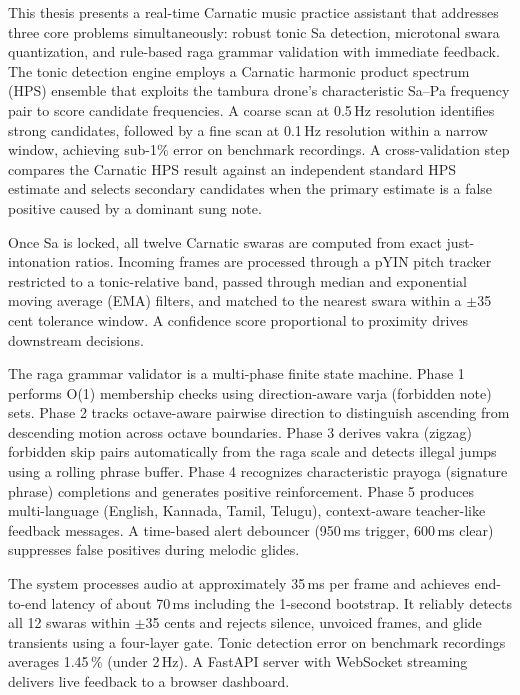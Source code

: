 \documentclass[12pt,a4paper]{report}
\numberwithin{equation}{chapter}
\begin{document}
This thesis presents a real-time Carnatic music practice assistant that addresses three core problems simultaneously: robust tonic Sa detection, microtonal swara quantization, and rule-based raga grammar validation with immediate feedback. The tonic detection engine employs a Carnatic harmonic product spectrum (HPS) ensemble that exploits the tambura drone's characteristic Sa--Pa frequency pair to score candidate frequencies. A coarse scan at 0.5\,Hz resolution identifies strong candidates, followed by a fine scan at 0.1\,Hz resolution within a narrow window, achieving sub-1\% error on benchmark recordings. A cross-validation step compares the Carnatic HPS result against an independent standard HPS estimate and selects secondary candidates when the primary estimate is a false positive caused by a dominant sung note.

Once Sa is locked, all twelve Carnatic swaras are computed from exact just-intonation ratios. Incoming frames are processed through a pYIN pitch tracker restricted to a tonic-relative band, passed through median and exponential moving average (EMA) filters, and matched to the nearest swara within a $\pm$35 cent tolerance window. A confidence score proportional to proximity drives downstream decisions.

The raga grammar validator is a multi-phase finite state machine. Phase 1 performs O(1) membership checks using direction-aware varja (forbidden note) sets. Phase 2 tracks octave-aware pairwise direction to distinguish ascending from descending motion across octave boundaries. Phase 3 derives vakra (zigzag) forbidden skip pairs automatically from the raga scale and detects illegal jumps using a rolling phrase buffer. Phase 4 recognizes characteristic prayoga (signature phrase) completions and generates positive reinforcement. Phase 5 produces multi-language (English, Kannada, Tamil, Telugu), context-aware teacher-like feedback messages. A time-based alert debouncer (950\,ms trigger, 600\,ms clear) suppresses false positives during melodic glides.

The system processes audio at approximately 35\,ms per frame and achieves end-to-end latency of about 70\,ms including the 1-second bootstrap. It reliably detects all 12 swaras within $\pm$35 cents and rejects silence, unvoiced frames, and glide transients using a four-layer gate. Tonic detection error on benchmark recordings averages 1.45\,\% (under 2\,Hz). A FastAPI server with WebSocket streaming delivers live feedback to a browser dashboard.
\end{document}
